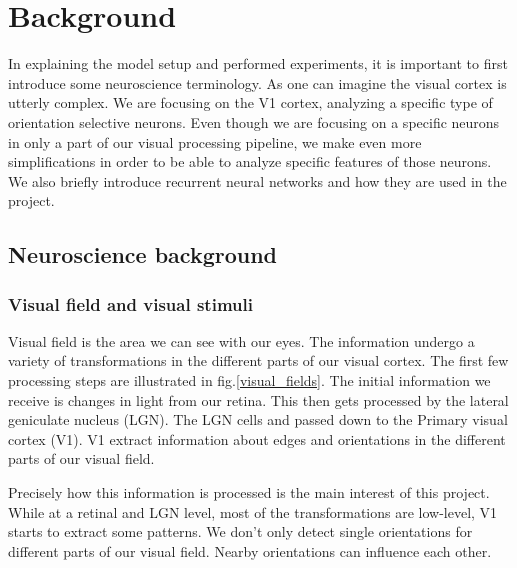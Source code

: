 

\chapter{Background}

In explaining the model setup and performed experiments, it is important to first introduce some neuroscience terminology. As one can imagine the visual cortex is utterly complex. We are focusing on the V1 cortex, analyzing a specific type of orientation selective neurons. Even though we are focusing on a specific neurons in only a part of our visual processing pipeline, we make even more simplifications in order to be able to analyze specific features of those neurons. We also briefly introduce recurrent neural networks and how they are used in the project.

\section{Neuroscience background}
\subsection{Visual field and visual stimuli}

Visual field is the area we can see with our eyes. The information undergo a variety of transformations in the different parts of our visual cortex. The first few processing steps are illustrated in fig.\ref{visual_fields}. The initial information we receive is changes in light from our retina. This then gets processed by the lateral geniculate nucleus (LGN). The LGN cells  and passed down to the Primary visual cortex (V1). V1 extract information about edges and orientations in the different parts of our visual field. 


Precisely how this information is processed is the main interest of this project. While at a retinal and LGN level, most of the transformations are low-level, V1 starts to extract some patterns. We don't only detect single orientations for different parts of our visual field. Nearby orientations can influence each other. 

